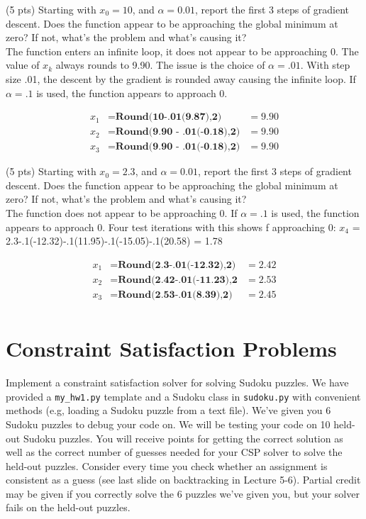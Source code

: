 \documentclass{article}
\begin{document}
(5 pts) Starting with $x_0 = 10$, and $\alpha = 0.01$, report the first 3 steps of gradient descent. Does the function appear to be approaching the global minimum at zero? If not, what's the problem and what's causing it?\\

The function enters an infinite loop, it does not appear to be approaching 0. The value of $x_k$ always rounds to 9.90. The issue is the choice of $\alpha=.01$. With step size .01, the descent by the gradient is rounded away causing the infinite loop. If $\alpha=.1$ is used, the function appears to approach 0. 

\begin{align}
    x_1 &= \textbf{Round(10-.01(9.87),2)} &= 9.90 \\
    x_2 &= \textbf{Round(9.90 - .01(-0.18),2)} &= 9.90 \\
    x_3 &= \textbf{Round(9.90 - .01(-0.18),2)} &= 9.90
\end{align}

(5 pts) Starting with $x_0 = 2.3$, and $\alpha = 0.01$, report the first 3 steps of gradient descent. Does the function appear to be approaching the global minimum at zero? If not, what's the problem and what's causing it?\\

The function does not appear to be approaching 0. If $\alpha = .1$ is used, the function appears to approach 0. Four test iterations with this shows f approaching 0: $x_4$ = 2.3-.1(-12.32)-.1(11.95)-.1(-15.05)-.1(20.58) = 1.78

\begin{align}
    x_1 &= \textbf{Round(2.3-.01(-12.32),2)} &= 2.42 \\
    x_2 &= \textbf{Round(2.42-.01(-11.23),2} &= 2.53 \\
    x_3 &= \textbf{Round(2.53-.01(8.39),2)} &= 2.45 \\
\end{align}

\section{Constraint Satisfaction Problems}
Implement a constraint satisfaction solver for solving Sudoku puzzles. We have provided a \texttt{my\_hw1.py} template and a Sudoku class in \texttt{sudoku.py} with convenient methods (e.g, loading a Sudoku puzzle from a text file). We've given you 6 Sudoku puzzles to debug your code on. We will be testing your code on 10 held-out Sudoku puzzles. You will receive points for getting the correct solution as well as the correct number of guesses needed for your CSP solver to solve the held-out puzzles. Consider every time you check whether an assignment is consistent as a guess (see last slide on backtracking in Lecture 5-6). Partial credit may be given if you correctly solve the 6 puzzles we've given you, but your solver fails on the held-out puzzles.
\end{document}
